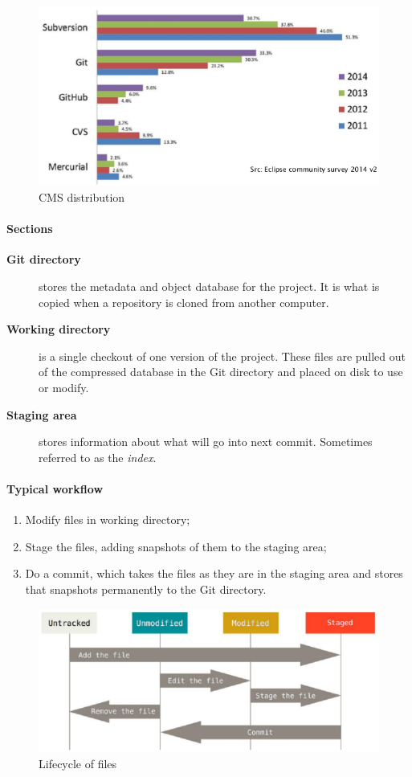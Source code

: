 \begin{figure}[hbtp]
\centering
\includegraphics[scale=0.4]{images/cms_distribution.png}
\caption{CMS distribution}
\end{figure}

\paragraph{Sections}
\begin{description}
\item [\textbf{Git directory}] stores the metadata and object database for the project. It is what is copied when a repository is cloned from another computer.
\item [\textbf{Working directory}] is a single checkout of one version of the project. These files are pulled out of the compressed database in the Git directory and placed on disk to use or modify.
\item [\textbf{Staging area}] stores information about what will go into next commit. Sometimes referred to as the \emph{index}.
\end{description}

\paragraph{Typical workflow}
\begin{enumerate}
\item Modify files in working directory;
\item Stage the files, adding snapshots of them to the staging area;
\item Do a commit, which takes the files as they are in the staging area and stores that snapshots permanently to the Git directory.
\end{enumerate}

\begin{figure}[hbtp]
\centering
\includegraphics[scale=0.4]{images/file_lifecycle.png}
\caption{Lifecycle of files}
\end{figure}

